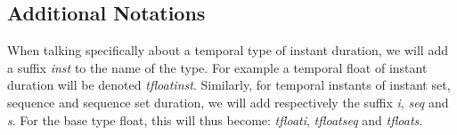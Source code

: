 \subsection{Additional Notations}

When talking specifically about a temporal type of instant duration, we will add a suffix \textit{inst} to the name of the type. For example a temporal float of instant duration will be denoted \textit{tfloatinst}. 
Similarly, for temporal instants of instant set, sequence and sequence set duration, we will add respectively the suffix \textit{i}, \textit{seq} and \textit{s}. For the base type float, this will thus become: \textit{tfloati}, \textit{tfloatseq} and \textit{tfloats}.